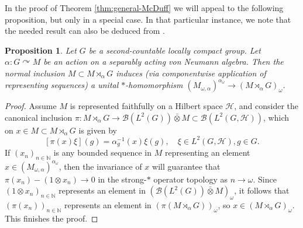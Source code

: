 \documentclass[11pt,a4paper]{article}
\newtheorem{prop}[theorem]{Proposition}
\theoremstyle{definition}
\theoremstyle{remark}
\numberwithin{equation}{section}
\numberwithin{theorem}{section}
\newcommand{\N}{\mathbb{N}}
\begin{document}
In the proof of Theorem \ref{thm:general-McDuff} we will appeal to the following proposition, but only in a special case.
In that particular instance, we note that the needed result can also be deduced from \cite[Lemma 3.3]{Tomatsu17}.

\begin{prop} \label{prop:cp-centralizer}
Let $G$ be a second-countable locally compact group.
Let $\alpha: G\curvearrowright M$ be an action on a separably acting von Neumann algebra.
Then the normal inclusion $M\subset M\rtimes_\alpha G$ induces (via componentwise application of representing sequences) a unital $*$-homomorphism
$(M_{\omega,\alpha})^{\alpha_\omega} \to (M\rtimes_\alpha G)_\omega$.
\end{prop}
\begin{proof}
Assume $M$ is represented faithfully on a Hilbert space $\mathcal{H}$, and consider the canonical inclusion $\pi\colon M \rtimes_\alpha G \rightarrow \mathcal{B}(L^2(G)) \bar{\otimes} M \subset \mathcal{B}(L^2(G, \mathcal{H}))$, which on $x \in M \subset M \rtimes_\alpha G$ is given by
\[ [\pi(x) \xi](g) = \alpha_g^{-1}(x)\xi(g), \quad \xi \in L^2(G, \mathcal{H}), g \in G.\]
If $(x_n)_{n \in \N}$ is any bounded sequence in $M$ representing an element $x \in (M_{\omega, \alpha})^{\alpha_\omega}$, then the invariance of $x$ will guarantee that
$\pi(x_n) - (1 \otimes x_n) \rightarrow 0$ in the strong-$*$ operator topology as $n \rightarrow \omega$. Since $(1 \otimes x_n)_{n \in \N}$ represents an element in $(\mathcal{B}(L^2(G)) \bar{\otimes} M)_\omega$, it follows that $(\pi(x_n))_{n \in \N}$ represents an element in $(\pi(M\rtimes_\alpha G))_\omega$, so $x \in (M\rtimes_\alpha G)_\omega$. This finishes the proof.
\end{proof}
\end{document}
